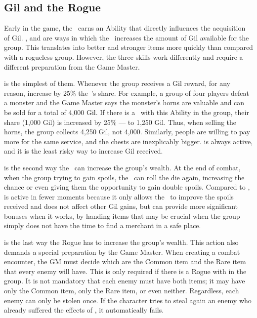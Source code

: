 \begin{multicols}{2}
\subsection{Gil and the Rogue}\label{subsec:inv-rogue}
Early in the game, the~ earns an Ability that directly influences the acquisition of Gil. ,  and  are ways in which the~ increases the amount of Gil available for the group. This translates into better and stronger items more quickly than compared with a rogueless group. However, the three skills work differently and require a different preparation from the Game Master.

 is the simplest of them. Whenever the group receives a Gil reward, for any reason, increase by 25\% the~’s share. For example, a group of four players defeat a monster and the Game Master says the monster’s horns are valuable and can be sold for a total of 4,000 Gil. If there is a~ with this Ability in the group, their share (1,000 Gil) is increased by 25\% --- to 1,250 Gil. Thus, when selling the horns, the group collects 4,250 Gil, not 4,000. Similarly, people are willing to pay more for the same service, and the chests are inexplicably bigger.  is always active, and it is the least risky way to increase Gil received.

\begin{center}
\end{center}

 is the second way the~ can increase the group’s wealth. At the end of combat, when the group trying to gain spoils, the~ can roll the die again, increasing the chance or even giving them the opportunity to gain double spoils. Compared to ,  is active in fewer moments because it only allows the~ to improve the spoils received and does not affect other Gil gains, but can provide more significant bonuses when it works, by handing items that may be crucial when the group simply does not have the time to find a merchant in a safe place.

 is the last way the Rogue has to increase the group’s wealth. This action also demands a special preparation by the Game Master. When creating a combat encounter, the GM must decide which are the Common item and the Rare item that every enemy will have. This is only required if there is a Rogue with  in the group. It is not mandatory that each enemy must have both items; it may have only the Common item, only the Rare item, or even neither. Regardless, each enemy can only be stolen once. If the character tries to steal again an enemy who already suffered the effects of , it automatically fails.


\end{multicols}
